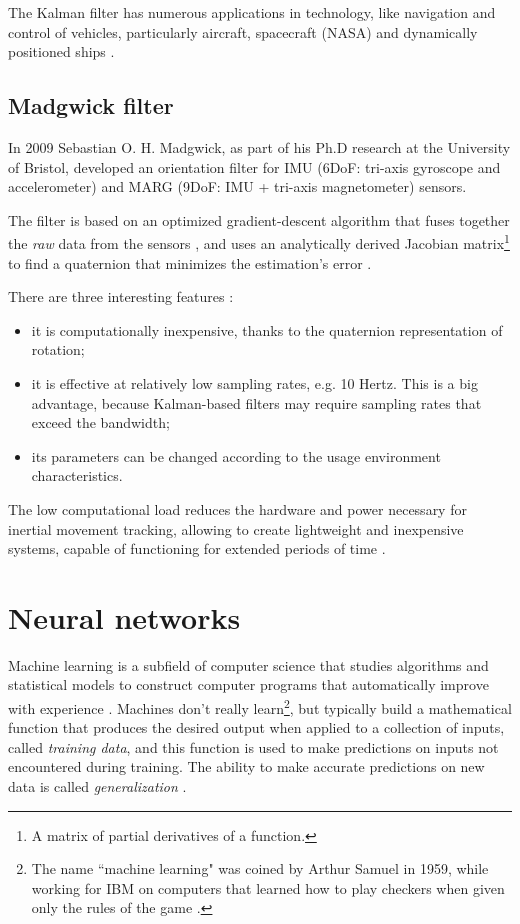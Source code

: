 The Kalman filter has numerous applications in technology, like navigation and control of vehicles, particularly aircraft, spacecraft (NASA) and dynamically positioned ships \cite{Tri83, Fun83}.

\subsection{Madgwick filter} \label{Madgwick filter}
In 2009 Sebastian O. H. Madgwick, as part of his Ph.D research at the University of Bristol, developed an orientation filter for IMU (6DoF: tri-axis gyroscope and accelerometer) and MARG (9DoF: IMU + tri-axis magnetometer) sensors.

The filter is based on an optimized gradient-descent algorithm that fuses together the \textit{raw} data from the sensors \cite{Mad10}, and uses an analytically derived Jacobian matrix\footnote{A matrix of partial derivatives of a function.} to find a quaternion that minimizes the estimation's error \cite{Che12}.
\bigbreak

There are three interesting features \cite{Mad10}:
\begin{itemize}
	\item it is computationally inexpensive, thanks to the quaternion representation of rotation;
	\item it is effective at relatively low sampling rates, e.g. 10 Hertz. This is a big advantage, because Kalman-based filters may require sampling rates that exceed the bandwidth;
	\item its parameters can be changed according to the usage environment characteristics.
\end{itemize}

The low computational load reduces the hardware and power necessary for inertial movement tracking, allowing to create lightweight and inexpensive systems, capable of functioning for extended periods of time \cite{Mad11}.

\section{Neural networks}
Machine learning is a subfield of computer science that studies algorithms and statistical models to construct computer programs that automatically improve with experience \cite{Mit97}. Machines don't really learn\footnote{The name ``machine learning" was coined by Arthur Samuel in 1959, while working for IBM on computers that learned how to play checkers when given only the rules of the game \cite{Sam59}.}, but typically build a mathematical function that produces the desired output when applied to a collection of inputs, called \textit{training data}, and this function is used to make predictions on inputs not encountered during training. The ability to make accurate predictions on new data is called \textit{generalization} \cite{Hay08}.
\bigbreak

